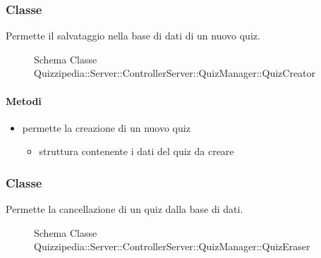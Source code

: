 \subsubsection{Classe }
Permette il salvataggio nella base di dati di un nuovo quiz.
\begin{figure}[H]
\centering
\noindent{}
\caption[Schema Classe QuizCreator]{Schema Classe Quizzipedia::Server::ControllerServer::QuizManager::QuizCreator}
\end{figure}
\paragraph{Metodi}
\begin{itemize}
\item {}
\newline
permette la creazione di un nuovo quiz
\newline
{}
\newline
\begin{itemize}
\item {}
\newline
struttura contenente i dati del quiz da creare
\end{itemize}
\end{itemize}
\subsubsection{Classe }
Permette la cancellazione di un quiz dalla base di dati.
\begin{figure}[H]
\centering
\noindent{}
\caption[Schema Classe QuizEraser]{Schema Classe Quizzipedia::Server::ControllerServer::QuizManager::QuizEraser}
\end{figure}
